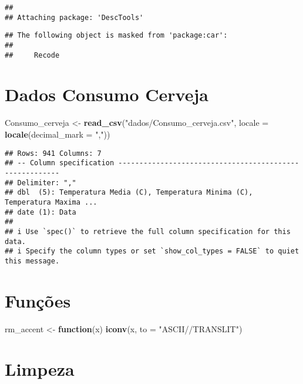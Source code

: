 \documentclass[
]{article}
\newenvironment{Shaded}{\begin{snugshade}}{\end{snugshade}}
\newcommand{\AttributeTok}[1]{\textcolor[rgb]{0.13,0.29,0.53}{#1}}
\newcommand{\ControlFlowTok}[1]{\textcolor[rgb]{0.13,0.29,0.53}{\textbf{#1}}}
\newcommand{\FunctionTok}[1]{\textcolor[rgb]{0.13,0.29,0.53}{\textbf{#1}}}
\newcommand{\NormalTok}[1]{#1}
\newcommand{\OtherTok}[1]{\textcolor[rgb]{0.56,0.35,0.01}{#1}}
\newcommand{\StringTok}[1]{\textcolor[rgb]{0.31,0.60,0.02}{#1}}
\begin{document}
\begin{verbatim}
## 
## Attaching package: 'DescTools'
\end{verbatim}

\begin{verbatim}
## The following object is masked from 'package:car':
## 
##     Recode
\end{verbatim}

\hypertarget{dados-consumo-cerveja}{%
\section{Dados Consumo Cerveja}\label{dados-consumo-cerveja}}

\begin{Shaded}
\begin{Highlighting}[]
\NormalTok{Consumo\_cerveja }\OtherTok{\textless{}{-}} \FunctionTok{read\_csv}\NormalTok{(}\StringTok{"dados/Consumo\_cerveja.csv"}\NormalTok{,   }
                            \AttributeTok{locale =} \FunctionTok{locale}\NormalTok{(}\AttributeTok{decimal\_mark =} \StringTok{","}\NormalTok{))}
\end{Highlighting}
\end{Shaded}

\begin{verbatim}
## Rows: 941 Columns: 7
## -- Column specification --------------------------------------------------------
## Delimiter: ","
## dbl  (5): Temperatura Media (C), Temperatura Minima (C), Temperatura Maxima ...
## date (1): Data
## 
## i Use `spec()` to retrieve the full column specification for this data.
## i Specify the column types or set `show_col_types = FALSE` to quiet this message.
\end{verbatim}

\hypertarget{funuxe7uxf5es}{%
\section{Funções}\label{funuxe7uxf5es}}

\begin{Shaded}
\begin{Highlighting}[]
\NormalTok{rm\_accent }\OtherTok{\textless{}{-}} \ControlFlowTok{function}\NormalTok{(x) }\FunctionTok{iconv}\NormalTok{(x, }\AttributeTok{to =} \StringTok{"ASCII//TRANSLIT"}\NormalTok{)}
\end{Highlighting}
\end{Shaded}

\hypertarget{limpeza}{%
\section{Limpeza}\label{limpeza}}
\end{document}
